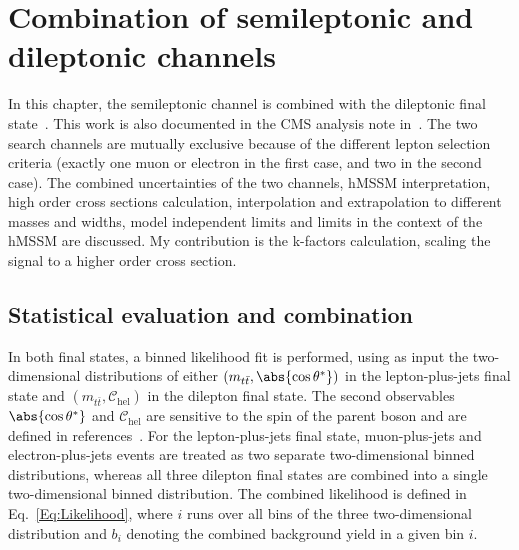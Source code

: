 \graphicspath{{chapt_dutch/}{intro/}{chapt2/}{chapt3/}{chapt4/}{chapt5/}{chapt6/}{chapt7/}{chapt8}}

\renewcommand{\bibname}{References}
\renewcommand\evenpagerightmark{{\scshape\small Chapter 7}}
\renewcommand\oddpageleftmark{{\scshape\small Combination of semileptonic and dileptonic channels}}

\chapter[Combination of semileptonic and dileptonic channels]%
{Combination of semileptonic and dileptonic channels}\label{chapt:8}

\hyphenation{}
In this chapter, the semileptonic channel is combined with the dileptonic final state~\cite{CMS-AN-16-164}. This work is also documented in the CMS analysis note in~\cite{CMS-AN-17-202}. The two search channels are mutually exclusive because of the different lepton selection criteria (exactly one muon or electron in the first case, and two in the second case). The combined uncertainties of the two channels, hMSSM interpretation, high order cross sections calculation, interpolation and extrapolation to different masses and widths, model independent limits and limits in the context of the hMSSM are discussed. My contribution is the k-factors calculation, scaling the signal to a higher order cross section. 

\section{Statistical evaluation and combination}
In both final states, a binned likelihood fit is performed, using as input the two-dimensional distributions of either $(m_{t\bar t}, \abs{\cos\theta^*})$ in the lepton-plus-jets final state and $(m_{t\bar t}, \mathcal{C}_\mathrm{hel})$ in the dilepton final state. The second observables $\abs{\cos\theta^*}$ and $\mathcal{C}_\mathrm{hel}$ are sensitive to the spin of the parent boson and are defined in references~\cite{CMS-AN-16-272,CMS-AN-16-164}. For the lepton-plus-jets final state, muon-plus-jets and electron-plus-jets events are treated as two separate two-dimensional binned distributions, whereas all three dilepton final states are combined into a single two-dimensional binned distribution. The combined likelihood is defined in Eq.~\ref{Eq:Likelihood}, where $i$ runs over all bins of the three two-dimensional distribution and $b_{i}$ denoting the combined background yield in a given bin $i$.

